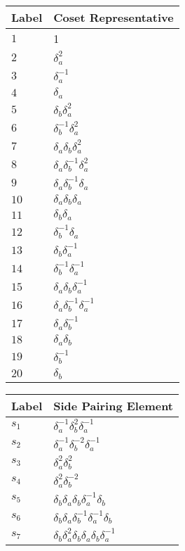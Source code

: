 \documentclass{article}
\begin{document}
\begin{center}
\begin{tabular}{ll}
\toprule
Label & Coset Representative\\
\midrule
$1$ & 1 \\
$2$ & $\delta_a^{2}$ \\
$3$ & $\delta_a^{-1}$ \\
$4$ & $\delta_a^{}$ \\
$5$ & $\delta_b^{}\delta_a^{2}$ \\
$6$ & $\delta_b^{-1}\delta_a^{2}$ \\
$7$ & $\delta_a^{}\delta_b^{}\delta_a^{2}$ \\
$8$ & $\delta_a^{}\delta_b^{-1}\delta_a^{2}$ \\
$9$ & $\delta_a^{}\delta_b^{-1}\delta_a^{}$ \\
$10$ & $\delta_a^{}\delta_b^{}\delta_a^{}$ \\
$11$ & $\delta_b^{}\delta_a^{}$ \\
$12$ & $\delta_b^{-1}\delta_a^{}$ \\
$13$ & $\delta_b^{}\delta_a^{-1}$ \\
$14$ & $\delta_b^{-1}\delta_a^{-1}$ \\
$15$ & $\delta_a^{}\delta_b^{}\delta_a^{-1}$ \\
$16$ & $\delta_a^{}\delta_b^{-1}\delta_a^{-1}$ \\
$17$ & $\delta_a^{}\delta_b^{-1}$ \\
$18$ & $\delta_a^{}\delta_b^{}$ \\
$19$ & $\delta_b^{-1}$ \\
$20$ & $\delta_b^{}$ \\
\bottomrule
\end{tabular}
\hfill
\begin{tabular}{ll}
\toprule
Label & Side Pairing Element\\
\midrule
$s_{1}$ & $\delta_a^{-1}\delta_b^{2}\delta_a^{-1}$ \\
$s_{2}$ & $\delta_a^{-1}\delta_b^{-2}\delta_a^{-1}$ \\
$s_{3}$ & $\delta_a^{2}\delta_b^{2}$ \\
$s_{4}$ & $\delta_a^{2}\delta_b^{-2}$ \\
$s_{5}$ & $\delta_b^{}\delta_a^{}\delta_b^{}\delta_a^{-1}\delta_b^{}$ \\
$s_{6}$ & $\delta_b^{}\delta_a^{}\delta_b^{-1}\delta_a^{-1}\delta_b^{}$ \\
$s_{7}$ & $\delta_b^{}\delta_a^{2}\delta_b^{}\delta_a^{}\delta_b^{}\delta_a^{-1\
}$ \\

\end{tabular}
\end{center}
\end{document}
